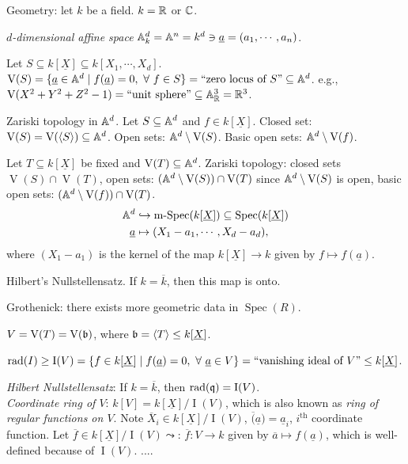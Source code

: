 \begin{remark}
    Geometry: let $k$ be a field. $k = \mathbb{R}$ or $\mathbb{C}$. \par 
    \emph{$d$-dimensional affine space} $\mathbb{A}^d_k = \mathbb{A}^n = k^d \ni \underline a = (a_1,\cdots,a_n)$. \par 
    Let $S \subseteq k[\underline X] \subseteq k[X_1,\cdots,X_d]$. $\operatorname{V}(S) = \{\underline a \in \mathbb{A}^d \mid f(\underline a) = 0,\ \forall \  f \in S\} = \text{``zero locus of $S$''} \subseteq \mathbb{A}^d$. e.g., $\operatorname{V}(X^2+Y^2+Z^2-1) = \text{``unit sphere''} \subseteq \mathbb{A}^3_{\mathbb{R}} = \mathbb{R}^3$. \par 
    Zariski topology in $\mathbb{A}^d$. Let $S \subseteq \mathbb{A}^d$ and $f \in k[\underline X]$. Closed set: $\operatorname{V}(S) = \operatorname{V}(\langle S \rangle) \subseteq \mathbb{A}^d$. Open sets: $\mathbb{A}^d \setminus \operatorname{V}(S)$. Basic open sets: $\mathbb{A}^d \setminus \operatorname{V}(f)$. \par 
    Let $T \subseteq k[\underline X]$ be fixed and $\operatorname{V}(T) \subseteq \mathbb{A}^d$. Zariski topology: closed sets $\operatorname{V}(S) \cap \operatorname{V}(T)$, open sets: $(\mathbb{A}^d \setminus \operatorname{V}(S)) \cap \operatorname{V}(T)$ since $\mathbb{A}^d \setminus \operatorname{V}(S)$ is open, basic open sets: $(\mathbb{A}^d \setminus \operatorname{V}(f)) \cap \operatorname{V}(T)$.
    \begin{align*}
        \mathbb{A}^d &\hookrightarrow \operatorname{m-Spec}(k[\underline X]) \subseteq \operatorname{Spec}(k[\underline X]) \\
        \underline a &\mapsto (X_1-a_1,\cdots,X_d-a_d), 
    \end{align*}
    where $(X_1-a_1)$ is the kernel of the map $k[\underline X] \to k$ given by $f \mapsto f(\underline a)$. \par 
    Hilbert's Nullstellensatz. If $k = \overline k$, then this map is onto. \par 
    Grothenick: there exists more geometric data in $\operatorname{Spec}(R)$. \par 
    $V = \operatorname{V}(T) = \operatorname{V}(\mathfrak{b})$, where $\mathfrak{b} = \langle T \rangle \leq k[\underline X]$. \par 
    $\operatorname{rad}(I) \geq \operatorname{I}(V) = \{f \in k[\underline X] \mid f(\underline a) = 0,\ \forall \  \underline a \in V\} = \text{``vanishing ideal of $V$''} \leq k[\underline X]$. \par 
    \emph{Hilbert Nullstellensatz}: If $k = \overline k$, then $\operatorname{rad}(\mathfrak{q}) = \operatorname{I}(V)$. \\
    \emph{Coordinate ring of $V$}: $k[V] = k[\underline X]/\operatorname{I}(V)$, which is also known as \emph{ring of regular functions on $V$}. Note $\overbar X_i \in k[\underline X]/\operatorname{I}(V)$, $\overbar (\underline a) = \underline a_i$, $i^{\text{th}}$ coordinate function. Let $\overbar f \in k[\underline X]/\operatorname{I}(V) \leadsto$: $\overbar f: V \to k$ given by $\overline a \mapsto f(\underline a)$, which is well-defined because of $\operatorname{I}(V)$. $....$
\end{remark}

